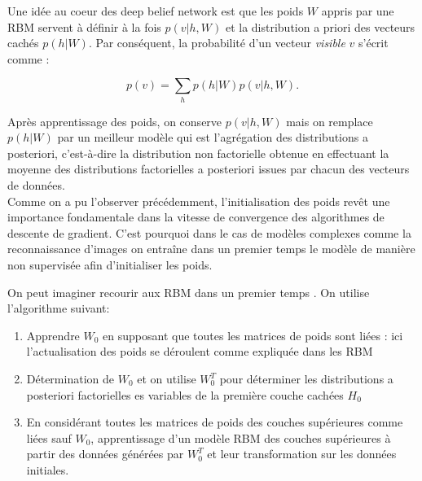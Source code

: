 \documentclass{article}
\theoremstyle{definition}
\begin{document}
\noindent Une idée au coeur des deep belief network est que les poids $W$ appris par une RBM servent à définir à la fois $p(v|h,W)$ et la distribution a priori des vecteurs cachés $p(h|W)$. Par conséquent, la probabilité d'un vecteur \textit{visible} $v$ s'écrit comme :

\[p(v)=\displaystyle \sum_h p(h|W)p(v|h,W).\]

\noindent Après apprentissage des poids, on conserve $p(v|h,W)$ mais on remplace $p(h|W)$ par un meilleur modèle qui est l'agrégation des distributions a posteriori, c'est-à-dire la distribution non factorielle obtenue en effectuant la moyenne des distributions factorielles a posteriori issues par chacun des vecteurs de données.\\

\noindent Comme on a pu l'observer précédemment, l'initialisation des poids revêt une importance fondamentale dans la vitesse de convergence des algorithmes de descente de gradient. C'est pourquoi dans le cas de modèles complexes comme la reconnaissance d'images on entraîne dans un premier temps le modèle de manière non supervisée afin d'initialiser les poids.\\


\noindent On peut imaginer recourir aux RBM dans un premier temps . On utilise l'algorithme suivant:
\begin{enumerate}
\item Apprendre $W_0$ en supposant que toutes les matrices de poids sont liées : ici l'actualisation des poids se déroulent comme expliquée dans les RBM
\item Détermination de $W_0$ et on utilise $W_0^T$ pour déterminer les distributions a posteriori factorielles es variables de la première couche cachées $H_0$
\item En considérant toutes les matrices de poids des couches supérieures comme liées sauf $W_0$, apprentissage d'un modèle RBM des couches supérieures à partir des données générées par $W_0^T$ et leur transformation sur les données initiales.
\end{enumerate}
\end{document}
